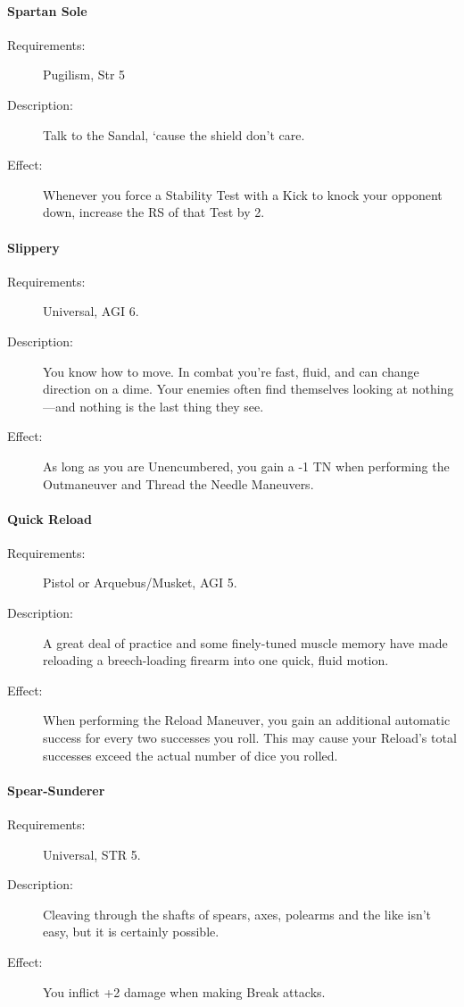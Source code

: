 \documentclass[oneside,11pt,english]{book}
\begin{document}
\paragraph{\label{talent:Spartan Sole}Spartan Sole}
\begin{description}
	\item [Requirements:] Pugilism, Str 5 
	\item [Description:] Talk to the Sandal, ‘cause the shield don’t care. 
	\item [Effect:] Whenever you force a Stability Test with a Kick to knock your opponent down, increase the RS of that Test by 2. 
	
\end{description}
\paragraph{\label{talent:Slippery}Slippery}
\begin{description}
	\item [Requirements:] Universal, AGI 6. 
	\item [Description:] You know how to move. In combat you're fast, fluid, and can change direction on a dime. 
	Your enemies often find themselves looking at nothing—and nothing is the last thing they see. 
	\item [Effect:] As long as you are Unencumbered, you gain a -1 TN when performing the Outmaneuver and Thread the Needle Maneuvers.
	
\end{description}
\paragraph{\label{talent:Quick Reload}Quick Reload}
\begin{description}
	\item [Requirements:] Pistol or Arquebus/Musket, AGI 5. 
	\item [Description:] A great deal of practice and some finely-tuned muscle memory have made reloading a breech-loading firearm into one quick, fluid motion. 
	\item [Effect:] When performing the Reload Maneuver, you gain an additional automatic success for every two successes you roll. This may cause your Reload’s total successes exceed the actual number of dice you rolled. 
	
\end{description}
\paragraph{\label{talent:Spear-Sunderer}Spear-Sunderer}
\begin{description}
	\item [Requirements:] Universal, STR 5. 
	\item [Description:] Cleaving through the shafts of spears, axes, polearms and the like isn’t easy, but it is certainly possible.
	\item [Effect:] You inflict +2 damage when making Break attacks. 
	
\end{description}
\end{document}
